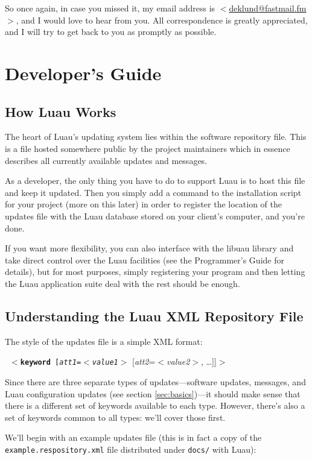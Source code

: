 \documentclass{report}
\begin{document}
So once again, in case you missed it, my email address is \href{mailto:deklund@fastmail.fm}{$<$deklund@fastmail.fm$>$}, and I would love to hear from you.  All correspondence is greatly appreciated, and I will try to get back to you as promptly as possible.

\chapter{Developer's Guide}

\section{How Luau Works}

The heart of Luau's updating system lies within the software repository file.  This is a file hosted somewhere public by the project maintainers which in essence describes all currently available updates and messages.

As a developer, the only thing you have to do to support Luau is to host this file and keep it updated.  Then you simply add a command to the installation script for your project (more on this later) in order to register the location of the updates file with the Luau database stored on your client's computer, and you're done.

If you want more flexibility, you can also interface with the libuau library and take direct control over the Luau facilities (see the Programmer's Guide for details), but for most purposes, simply registering your program and then letting the Luau application suite deal with the rest should be enough.

\section{Understanding the Luau XML Repository File}

The style of the updates file is a simple XML format:

\texttt{
$<$\textbf{keyword} [\emph{att1}=$<$\emph{value1}$>$} [\emph{att2}=$<$\emph{value2}$>$, \ldots]]$>$

Since there are three separate types of updates---software updates, messages, and Luau configuration updates (see section \ref{sec:basics})---it should make sense that there is a different set of keywords available to each type.  However, there's also a set of keywords common to all types: we'll cover those first.

We'll begin with an example updates file (this is in fact a copy of the \verb+example.respository.xml+ file distributed under \verb+docs/+ with Luau):
\end{document}
